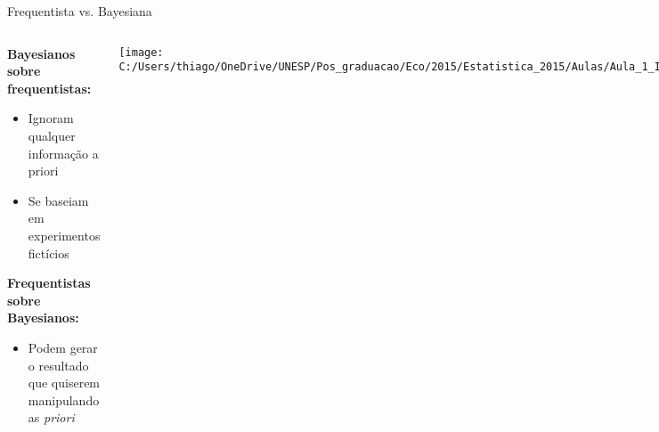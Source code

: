 \documentclass{beamer}\usepackage[]{graphicx}\usepackage[]{color}
\begin{document}
\begin{frame}{Frequentista vs. Bayesiana}

\begin{columns}[lr]


\begin{scriptsize}
\textbf{Bayesianos sobre frequentistas:
}
\begin{itemize}

  \item{Ignoram qualquer informação a priori}
  
  \item{Se baseiam em experimentos fictícios}
  
\end{itemize}

\vspace{.5in}

\textbf{Frequentistas sobre Bayesianos:}

\begin{itemize}

  \item{Podem gerar o resultado que quiserem manipulando as \emph{priori}}
  
\end{itemize}

\end{scriptsize}


  \texttt{[image: C:/Users/thiago/OneDrive/UNESP/Pos\_graduacao/Eco/2015/Estatistica\_2015/Aulas/Aula\_1\_Intro\_2015/figs/frequentists\_vs\_bayesians.png]}
  \tiny{}

\end{columns}


\end{frame}
\end{document}
